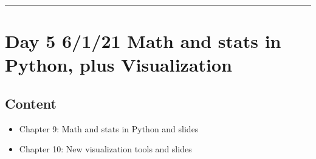 \documentclass[letterpaper,10pt,english]{jupyterBook}
\begin{document}
\bigskip\hrule\bigskip



\section{Day 5 \sphinxhyphen{} 6/1/21 \sphinxhyphen{} Math and stats in Python, plus Visualization}
\label{\detokenize{course-schedule:day-5-6-1-21-math-and-stats-in-python-plus-visualization}}

\subsection{Content}
\label{\detokenize{course-schedule:id7}}\begin{itemize}
\item {} 
\sphinxAtStartPar
Chapter 9: Math and stats in Python \sphinxhyphen{} {\hyperref[\detokenize{chapter-9-math-and-stats::doc}]{}} and slides

\item {} 
\sphinxAtStartPar
Chapter 10: New visualization tools \sphinxhyphen{} {\hyperref[\detokenize{chapter-10-visualization::doc}]{}} and slides

\end{itemize}
\end{document}
